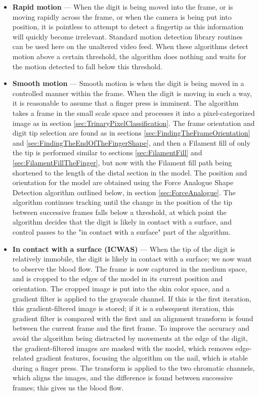 \begin{itemize}
\item \textbf{Rapid motion} --- When the digit is being moved into the frame, or is moving rapidly across the frame, or when the camera is being put into position, it is pointless to attempt to detect a fingertip as this information will quickly become irrelevant. Standard motion detection library routines can be used here on the unaltered video feed. When these algorithms detect motion above a certain threshold, the algorithm does nothing and waits for the motion detected to fall below this threshold.
\item \textbf{Smooth motion} --- Smooth motion is when the digit is being moved in a controlled manner within the frame. When the digit is moving in such a way, it is reasonable to assume that a finger press is imminent. The algorithm takes a frame in the small scale space and processes it into a pixel-categorized image as in section \ref{sec:TrinaryPixelClassification}. The frame orientation and digit tip selection are found as in sections \ref{sec:FindingTheFrameOrientation} and \ref{sec:FindingTheEndOfTheFingerShape}, and then a Filament fill of only the tip is performed similar to sections \ref{sec:FilamentFill} and \ref{sec:FilamentFillTheFinger}, but now with the Filament fill path being shortened to the length of the distal section in the model. The position and orientation for the model are obtained using the Force Analogue Shape Detection algorithm outlined below, in section \ref{sec:ForceAnalogue}. The algorithm continues tracking until the change in the position of the tip between successive frames falls below a threshold, at which point the algorithm decides that the digit is likely in contact with a surface, and control passes to the "in contact with a surface" part of the algorithm.
\item \textbf{In contact with a surface (ICWAS)} --- When the tip of the digit is relatively immobile, the digit is likely in contact with a surface; we now want to observe the blood flow. The frame is now captured in the medium space, and is cropped to the edges of the model in its current position and orientation. The cropped image is put into the skin color space, and a gradient filter is applied to the grayscale channel. If this is the first iteration, this gradient-filtered image is stored; if it is a subsequent iteration, this gradient filter is compared with the first and an alignment transform is found between the current frame and the first frame. To improve the accuracy and avoid the algorithm being distracted by movements at the edge of the digit, the gradient-filtered images are masked with the model, which removes edge-related gradient features, focusing the algorithm on the nail, which is stable during a finger press. The transform is applied to the two chromatic channels, which aligns the images, and the difference is found between successive frames; this gives us the blood flow. 
\end{itemize}

